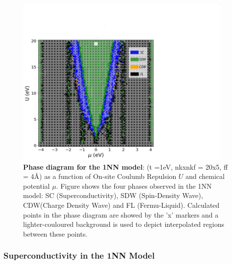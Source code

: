 \documentclass[12pt]{article}
\begin{document}
\begin{figure}[htbp]  %
    \centering
    \includegraphics[width=0.95\textwidth]{1NNphased.png}  %
    \caption{\textbf{Phase diagram for the 1NN model}:  (t =1eV, nkxnkf = 20x5, ff = 4\AA) as a function of On-site Coulumb Repulsion $U$ and chemical potential $\mu$. 
    Figure shows the four phases observed in the 1NN model: SC (Superconductivity), SDW (Spin-Density Wave), CDW(Charge Density Wave) and FL (Fermu-Liquid).
    Calculated points in the phase diagram are showed by the 'x' markers and a lighter-couloured background is used to depict interpolated regions between these points. }
    \label{fig:1NNpd}
\end{figure}




\subsubsection{Superconductivity in the 1NN Model}
\end{document}
